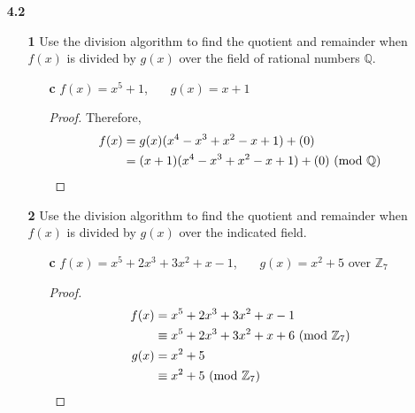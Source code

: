 \documentclass[paper=usletter, fontsize=12pt]{article}
\begin{document}

    \begin{enumerate}

        \item[\textbf{4.2}]
        \begin{enumerate}

            \item[\textbf{1}] Use the division algorithm to find the quotient
            and remainder when $f(x)$ is divided by $g(x)$ over the field of
            rational numbers $\mathbb{Q}$.
            \begin{enumerate}

                \item[\textbf{c}] $f(x) = x^5+1$, \ \ \ $g(x) = x+1$
                \begin{proof}


                    Therefore,
                    \begin{align*}
                        f(x) & = g(x)(x^4-x^3+x^2-x+1) + (0)\\
                        & = (x+1)(x^4-x^3+x^2-x+1) + (0) \ (\mathrm{mod}\ \mathbb{Q}) \qedhere
                    \end{align*}

                \end{proof}

            \end{enumerate}

            \item[\textbf{2}] Use the division algorithm to find the quotient
            and remainder when $f(x)$ is divided by $g(x)$ over the indicated
            field.
            \begin{enumerate}

                \item[\textbf{c}] $f(x) = x^5+2x^3+3x^2+x-1$, \ \ \ $g(x) =
                x^2+5$ over $\mathbb{Z}_7$
                \begin{proof}

                    \begin{align*}
                        f(x)&=x^5+2x^3+3x^2+x-1 \\
                        & \equiv x^5+2x^3+3x^2+x+6 \ (\mathrm{mod}\ \mathbb{Z}_7)\\
                        g(x) &= x^2+5\\
                        &\equiv x^2+5 \ (\mathrm{mod}\ \mathbb{Z}_7)
                    \end{align*}


\end{proof}
\end{enumerate}
\end{enumerate}
\end{enumerate}
\end{document}
